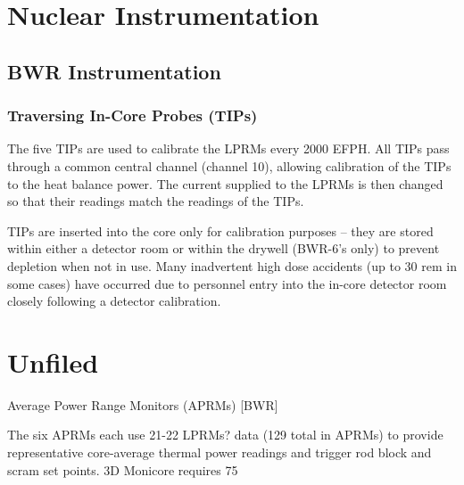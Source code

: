 \documentclass[10pt]{article}
\begin{document}
\section{Nuclear Instrumentation}

\subsection{BWR Instrumentation}
\subsubsection{Traversing In-Core Probes (TIPs)}

The five TIPs are used to calibrate the LPRMs every 2000 EFPH. All TIPs pass through a common central channel (channel 10), allowing calibration of the TIPs to the heat balance power. The current supplied to the LPRMs is then changed so that their readings match the readings of the TIPs. 

TIPs are inserted into the core only for calibration purposes – they are stored within either a detector room or within the drywell (BWR-6’s only) to prevent depletion when not in use. Many inadvertent high dose accidents (up to 30 rem in some cases) have occurred due to personnel entry into the in-core detector room closely following a detector calibration. 

\section{Unfiled}

Average Power Range Monitors (APRMs) [BWR]

The six APRMs each use 21-22 LPRMs? data (129 total in APRMs) to provide representative core-average thermal power readings and trigger rod block and scram set points. 3D Monicore requires 75%
\end{document}
